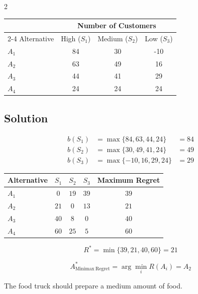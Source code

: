 \begin{multicols}{2}
		\begin{center}
			\renewcommand{\arraystretch}{1.3}
			\small
			\begin{tabular}{lccc}
				\toprule
				& \multicolumn{3}{c}{Number of Customers} \\
				\cmidrule(lr){2-4}
				Alternative & High ($S_1$) & Medium ($S_2$) & Low ($S_3$) \\
				\midrule
				$A_1$ & 84 & 30 & -10 \\
				$A_2$ & 63 & 49 & 16 \\
				$A_3$ & 44 & 41 & 29 \\
				$A_4$ & 24 & 24 & 24 \\
				\bottomrule
			\end{tabular}
		\end{center}
		
		\subsection*{Solution}
		
		\[
		\begin{array}{lll}
			b(S_1) &= \max\{84,63,44,24\} &= 84 \\[3pt]
			b(S_2) &= \max\{30,49,41,24\} &= 49 \\[3pt]
			b(S_3) &= \max\{-10,16,29,24\} &= 29
		\end{array}
		\]
		
		\begin{center}
			\renewcommand{\arraystretch}{1.5}
			\small
			\begin{tabular}{lcccc}
				\toprule
				Alternative & $S_1$ & $S_2$ & $S_3$ & Maximum Regret \\
				\midrule
				$A_1$ & $0$ & $19$ & $39$ & $39$ \\
				$A_2$ & $21$ & $0$ & $13$ & $21$ \\
				$A_3$ & $40$ & $8$ & $0$ & $40$ \\
				$A_4$ & $60$ & $25$ & $5$ & $60$ \\
				\bottomrule
			\end{tabular}
		\end{center}
		
		\[
		R^*
		=
		\min\{39,21,40,60\}
		=
		21
		\]
		
		\[
		A^*_{\mathrm{Minimax\ Regret}}
		=
		\arg\min_i R(A_i)
		=
		A_2
		\]
		
		The food truck should prepare a medium amount of food.
		
	\end{multicols}
	
			
